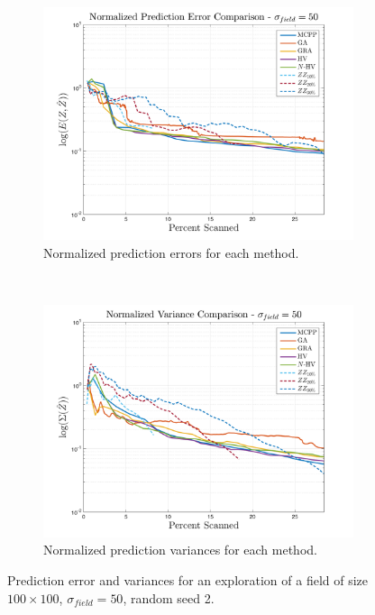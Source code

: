 \begin{figure}[htb!]
    \centering
    \begin{subfigure}[t]{0.75\textwidth}
        \centering
        \includegraphics[width=\linewidth]{figures/results/normalized_errors_30p_100x100_sf_50_seed_2_app_50.png}
        \captionsetup{skip=0.20\baselineskip,size=footnotesize}
        \caption{Normalized prediction errors for each method.}
    \end{subfigure}%
    \\
    \begin{subfigure}[t]{0.75\textwidth}
        \centering
        \includegraphics[width=\linewidth]{figures/results/normalized_variances_30p_100x100_sf_50_seed_2_app_50.png}
        \captionsetup{skip=0.20\baselineskip,size=footnotesize}
        \caption{Normalized prediction variances for each method.}
    \end{subfigure}%
    \captionsetup{skip=0.20\baselineskip}
    \caption{Prediction error and variances for an exploration of a field of size $100 \times 100$, $\sigma_{field} = 50$, random seed 2.}
    \label{fig:errvar50}
\end{figure}

